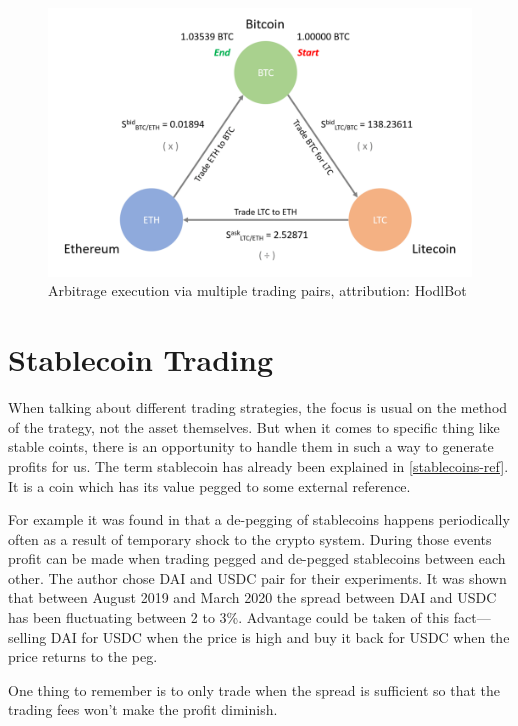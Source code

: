 \begin{figure}[ht]
    \centering
    \includegraphics[width=\columnwidth]{figures/arbitrage.png}
    \caption{Arbitrage execution via multiple trading pairs, attribution: HodlBot \cite{hodlbot:day-trading-cryptocurrency}}
    \label{arbitrage-figure}
\end{figure}

\section{Stablecoin Trading}

When talking about different trading strategies, the focus is usual on the method of the trategy, not the asset themselves. But when it comes to specific thing like stable coints, there is an opportunity to handle them in such a way to generate profits for us.
The term stablecoin has already been explained in \ref{stablecoins-ref}. It is a coin which has its value pegged to some external reference.

For example it was found in \cite{make-money-stablecoins} that a de-pegging of stablecoins happens periodically often as a result of temporary shock to the crypto system. During those events profit can be made when trading pegged and de-pegged stablecoins between each other. The author chose DAI and USDC pair for their experiments. It was shown that between August 2019 and March 2020 the spread between DAI and USDC has been fluctuating between 2 to 3\%. Advantage could be taken of this fact---selling DAI for USDC when the price is high and buy it back for USDC when the price returns to the peg.

One thing to remember is to only trade when the spread is sufficient so that the trading fees won't make the profit diminish.

